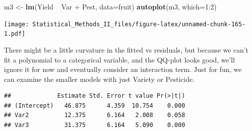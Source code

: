 \documentclass[]{book}
\newenvironment{Shaded}{\begin{snugshade}}{\end{snugshade}}
\newcommand{\KeywordTok}[1]{\textcolor[rgb]{0.13,0.29,0.53}{\textbf{{#1}}}}
\newcommand{\DataTypeTok}[1]{\textcolor[rgb]{0.13,0.29,0.53}{{#1}}}
\newcommand{\DecValTok}[1]{\textcolor[rgb]{0.00,0.00,0.81}{{#1}}}
\newcommand{\StringTok}[1]{\textcolor[rgb]{0.31,0.60,0.02}{{#1}}}
\newcommand{\NormalTok}[1]{{#1}}
\theoremstyle{definition}
\theoremstyle{definition}
\theoremstyle{remark}
\begin{document}
\begin{Shaded}
\begin{Highlighting}[]
\NormalTok{m3 <-}\StringTok{ }\KeywordTok{lm}\NormalTok{(Yield ~}\StringTok{ }\NormalTok{Var +}\StringTok{ }\NormalTok{Pest, }\DataTypeTok{data=}\NormalTok{fruit)}
\KeywordTok{autoplot}\NormalTok{(m3, }\DataTypeTok{which=}\DecValTok{1}\NormalTok{:}\DecValTok{2}\NormalTok{)}
\end{Highlighting}
\end{Shaded}

\texttt{[image: Statistical\_Methods\_II\_files/figure-latex/unnamed-chunk-165-1.pdf]}

There might be a little curvature in the fitted vs residuals, but
because we can't fit a polynomial to a categorical variable, and the
QQ-plot looks good, we'll ignore it for now and eventually consider an
interaction term. Just for fun, we can examine the smaller models with
just Variety or Pesticide.

\begin{Shaded}
\end{Shaded}

\begin{verbatim}
##             Estimate Std. Error t value Pr(>|t|)
## (Intercept)   46.875      4.359  10.754    0.000
## Var2          12.375      6.164   2.008    0.058
## Var3          31.375      6.164   5.090    0.000
\end{verbatim}

\begin{Shaded}
\end{Shaded}
\end{document}
